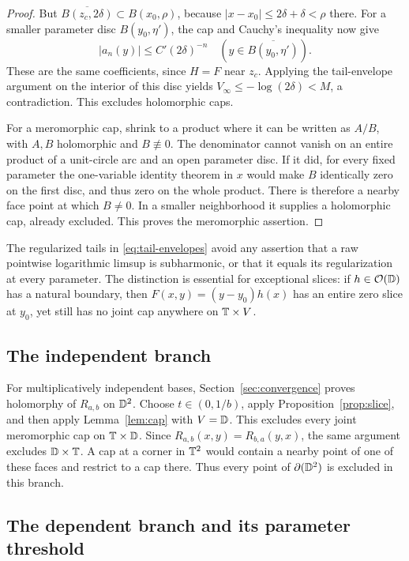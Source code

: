 \begin{proof}
But \(\overline{B(z_c,2\delta)}\subset B(x_0,\rho)\), because
\(|x-x_0|\leq2\delta+\delta<\rho\) there.
For a smaller parameter disc \(B(y_0,\eta')\), the cap and Cauchy's
inequality now give
\[
|a_n(y)|\leq C'(2\delta)^{-n}
\quad(y\in\overline{B(y_0,\eta')}).
\]
These are the same coefficients, since \(H=F\) near \(z_c\).
Applying the tail-envelope argument on the interior of this disc
yields \(V_\infty\leq-\log(2\delta)<M\), a contradiction.
This excludes holomorphic caps.

For a meromorphic cap, shrink to a product where it can be written
as \(A/B\), with \(A,B\) holomorphic and \(B\not\equiv0\).
The denominator cannot vanish on an entire product of a unit-circle
arc and an open parameter disc. If it did, for every fixed parameter
the one-variable identity theorem in \(x\) would make \(B\)
identically zero on the first disc, and thus zero on the whole product.
There is therefore a nearby face point at which \(B\ne0\).
In a smaller neighborhood it supplies a holomorphic cap, already
excluded. This proves the meromorphic assertion.
\end{proof}

The regularized tails in \eqref{eq:tail-envelopes} avoid any assertion
that a raw pointwise logarithmic limsup is subharmonic, or that it
equals its regularization at every parameter.
The distinction is essential for exceptional slices: if
\(h\in\mathcal O(\mathbb D)\) has a natural boundary, then
\(F(x,y)=(y-y_0)h(x)\) has an entire zero slice at \(y_0\), yet still
has no joint cap anywhere on \(\mathbb T\times V\).

\subsection{The independent branch}

For multiplicatively independent bases,
Section~\ref{sec:convergence} proves holomorphy of \(R_{a,b}\) on
\(\mathbb D^2\). Choose \(t\in(0,1/b)\), apply
Proposition~\ref{prop:slice}, and then apply Lemma~\ref{lem:cap} with
\(V=\mathbb D\). This excludes every joint meromorphic cap on
\(\mathbb T\times\mathbb D\).
Since \(R_{a,b}(x,y)=R_{b,a}(y,x)\), the same argument excludes
\(\mathbb D\times\mathbb T\).
A cap at a corner in \(\mathbb T^2\) would contain a nearby point of one
of these faces and restrict to a cap there. Thus every point of
\(\partial(\mathbb D^2)\) is excluded in this branch.

\subsection{The dependent branch and its parameter threshold}

